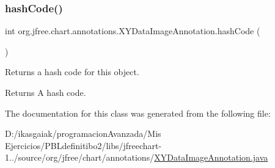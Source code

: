 \subsubsection{\texorpdfstring{hash\+Code()}{hashCode()}}
{\footnotesize\ttfamily int org.\+jfree.\+chart.\+annotations.\+X\+Y\+Data\+Image\+Annotation.\+hash\+Code (\begin{DoxyParamCaption}{ }\end{DoxyParamCaption})}

Returns a hash code for this object.

\begin{DoxyReturn}{Returns}
A hash code. 
\end{DoxyReturn}


The documentation for this class was generated from the following file\+:\begin{DoxyCompactItemize}
\item 
D\+:/ikasgaiak/programacion\+Avanzada/\+Mis Ejercicios/\+P\+B\+Ldefinitibo2/libs/jfreechart-\/1../source/org/jfree/chart/annotations/\mbox{\hyperlink{_x_y_data_image_annotation_8java}{X\+Y\+Data\+Image\+Annotation.\+java}}\end{DoxyCompactItemize}
